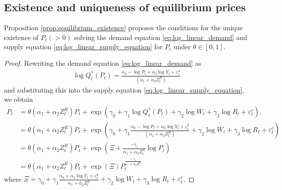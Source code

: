 \documentclass[11pt, a4paper]{article}
\begin{document}
\subsection{Existence and uniqueness of equilibrium prices}
    Proposition \ref{prop:equilibrium_existence} proposes the conditions for the unique existence of $P_{t}(>0)$ solving the demand equation \eqref{eq:log_linear_demand} and supply equation \eqref{eq:log_linear_supply_equation} for $P_{t}$ under $\theta\in[0,1]$.
    \begin{proof}
        
    Rewriting the demand equation \eqref{eq:log_linear_demand} as 
    \begin{align*}
        \log Q_t^*(P_{t})= \frac{\alpha_0 - \log P_{t} + \alpha_3 \log Y_t + \varepsilon^{d}_{t}}{(\alpha_1 + \alpha_2 Z^{R}_{t})}   
    \end{align*}
    and substituting this into the supply equation \eqref{eq:log_linear_supply_equation}, we obtain
    \begin{align}
        P_t &=\theta (\alpha_1 + \alpha_2 Z^{R}_{t}) P_t + \exp\left(\gamma_0 + \gamma_1 \log Q^*_t(P_{t}) +  \gamma_2 \log W_{t} + \gamma_3 \log R_t + \varepsilon^{c}_{t}\right). \nonumber\\
        & = \theta(\alpha_1 + \alpha_2 Z^{R}_{t})P_t + \exp\left(\gamma_0 + \gamma_1 \frac{\alpha_0 - \log P_{t} + \alpha_3 \log Y_t + \varepsilon^{d}_{t}}{(\alpha_1 + \alpha_2 Z^{R}_{t})} +\gamma_2 \log W_{t} + \gamma_3 \log R_{t} + \varepsilon^{c}_{t} \right)\nonumber\\
        & = \theta(\alpha_1 + \alpha_2 Z^{R}_{t})P_t  + \exp\left(\Xi + \frac{-\gamma_1}{\alpha_1+\alpha_2 Z^{R}_t} \log P_t \right)\nonumber\\
        &= \theta(\alpha_1 + \alpha_2 Z^{R}_{t})P_t  + \exp(\Xi) P_t^{\frac{-\gamma_1}{\alpha_1 + \alpha_2 Z^{R}_{t}}}
    \end{align}
    where $\Xi = \gamma_0 + \gamma_1\frac{\alpha_0 + \alpha_3 \log Y_t + \varepsilon^{d}_{t}}{\alpha_1 + \alpha_2 Z^{R}_{t}} +  \gamma_2 \log W_{t} + \gamma_3 \log R_t + \varepsilon^{c}_{t}$.
    

\end{proof}
\end{document}
